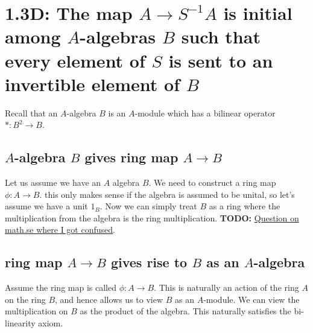 \documentclass{book}
\theoremstyle{definition}
\begin{document}
\section{1.3D: The map $A \rightarrow S^{-1}A$ is initial among $A$-algebras $B$ such that every element of $S$
         is sent to an invertible element of $B$}
Recall that an $A$-algebra $B$ is an $A$-module which has a bilinear operator $*: B^2 \rightarrow B$.

\subsection{$A$-algebra $B$ gives ring map $A \rightarrow B$}
Let us assume we have an $A$ algebra $B$. We need to construct a ring map $\phi: A \rightarrow B$.
this only makes sense if the algebra is assumed to be unital, so let's assume we have a unit $1_B$.
Now we can simply treat $B$ as a ring where the multiplication from the algebra is the ring multiplication.
\textbf{TODO:}
\href{https://math.stackexchange.com/questions/3756749/an-a-algebra-b-carries-the-same-data-as-a-ring-map-a-rightarrow-b}{Question on math.se where I got confused}.

\subsection{ring map $A \rightarrow B$ gives rise to $B$ as an $A$-algebra}
Assume the ring map is called $\phi: A \rightarrow B$. This is naturally an
action of the ring $A$ on the ring $B$, and hence allows us to view $B$ as
an $A$-module. We can view the multiplication on $B$ as the product of
the algebra. This naturally satisfies the bi-linearity axiom.
\end{document}
